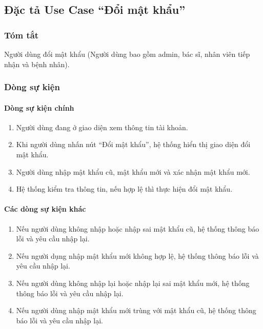 \subsection{Đặc tả Use Case ``Đổi mật khẩu''}

\subsubsection{Tóm tắt}
Người dùng đổi mật khẩu (Người dùng bao gồm admin, bác sĩ, nhân viên tiếp nhận và bệnh nhân).

\subsubsection{Dòng sự kiện}
\paragraph{\textbf{Dòng sự kiện chính}}
\begin{enumerate}
    \item Người dùng đang ở giao diện xem thông tin tài khoản.
    \item Khi người dùng nhấn nút ``Đổi mật khẩu'', hệ thống hiển thị giao diện đổi mật khẩu.
    \item Người dùng nhập mật khẩu cũ, mật khẩu mới và xác nhận mật khẩu mới.
    \item Hệ thống kiểm tra thông tin, nếu hợp lệ thì thực hiện đổi mật khẩu.
\end{enumerate}

\paragraph{\textbf{Các dòng sự kiện khác}}
\begin{enumerate}
    \item Nếu người dùng không nhập hoặc nhập sai mật khẩu cũ, hệ thống thông báo lỗi và yêu cầu nhập lại.
    \item Nếu người dụng nhập mật khẩu mới không hợp lệ, hệ thống thông báo lỗi và yêu cầu nhập lại.
    \item Nếu người dùng không nhập lại hoặc nhập lại sai mật khẩu mới, hệ thống thông báo lỗi và yêu cầu nhập lại.
    \item Nếu người dùng nhập mật khẩu mới trùng với mật khẩu cũ, hệ thống thông báo lỗi và yêu cầu nhập lại.
\end{enumerate}

